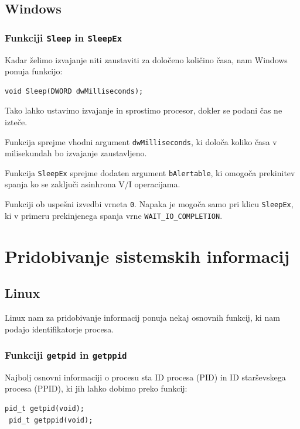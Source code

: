 \documentclass[a4paper,12pt,openright]{book}
\begin{document}
\subsection{Windows}

\subsubsection{Funkciji \texttt{Sleep} in \texttt{SleepEx}}

Kadar želimo izvajanje niti zaustaviti za določeno količino časa, nam Windows ponuja funkcijo:
\begin{lstlisting}[style=func]
 void Sleep(DWORD dwMilliseconds);
\end{lstlisting}
Tako lahko ustavimo izvajanje in sprostimo procesor, dokler se podani čas ne izteče.

Funkcija sprejme vhodni argument \texttt{dwMilliseconds}, ki določa koliko časa v milisekundah bo izvajanje zaustavljeno.

Funkcija \texttt{SleepEx} sprejme dodaten argument \texttt{bAlertable}, ki omogoča prekinitev spanja ko se zaključi asinhrona V/I operacijama.

Funkciji ob uspešni izvedbi vrneta \texttt{0}.
Napaka je mogoča samo pri klicu \texttt{SleepEx}, ki v primeru prekinjenega spanja vrne \texttt{WAIT\_IO\_COMPLETION}.

\section{Pridobivanje sistemskih informacij}

\subsection{Linux}

Linux nam za pridobivanje informacij ponuja nekaj osnovnih funkcij, ki nam podajo identifikatorje procesa.

\subsubsection{Funkciji \texttt{getpid} in \texttt{getppid}}

Najbolj osnovni informaciji o procesu sta ID procesa (PID) in ID starševskega procesa (PPID), ki jih lahko dobimo preko funkcij:
\begin{lstlisting}[style=func]
 pid_t getpid(void);
 pid_t getppid(void);
\end{lstlisting}
\end{document}
